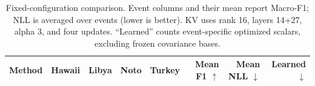 \begin{table}[t]
\centering\small
\caption{Fixed-configuration comparison. Event columns and their mean report
Macro-F1; NLL is averaged over events (lower is better). KV uses rank 16,
layers 14+27, alpha 3, and four updates. ``Learned'' counts event-specific
optimized scalars, excluding frozen covariance bases.}
\label{tab:fixed}
\begin{tabular}{lrrrrrrr}
\toprule
Method & Hawaii & Libya & Noto & Turkey & Mean F1 $\uparrow$ & Mean NLL $\downarrow$ & Learned $\downarrow$\\
\midrule

\bottomrule
\end{tabular}
\end{table}
